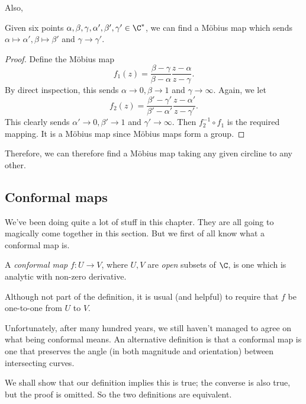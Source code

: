 \documentclass[a4paper]{article}
\begin{document}
Also,
\begin{prop}
  Given six points $\alpha, \beta, \gamma, \alpha', \beta', \gamma' \in \C^*$, we can find a M\"obius map which sends $\alpha \mapsto \alpha', \beta \mapsto \beta'$ and $\gamma \to \gamma'$.
\end{prop}

\begin{proof}
  Define the M\"obius map
  \[
    f_1(z) = \frac{\beta - \gamma}{\beta - \alpha} \frac{z - \alpha}{z - \gamma}.
  \]
  By direct inspection, this sends $\alpha \to 0, \beta \to 1$ and $\gamma \to \infty$. Again, we let
  \[
    f_2(z) = \frac{\beta' - \gamma'}{\beta' - \alpha'} \frac{z - \alpha'}{z - \gamma'}.
  \]
  This clearly sends $\alpha' \to 0, \beta' \to 1$ and $\gamma' \to \infty$. Then $f_2^{-1} \circ f_1$ is the required mapping. It is a M\"obius map since M\"obius maps form a group.
\end{proof}

Therefore, we can therefore find a M\"obius map taking any given circline to any other.

\subsection{Conformal maps}
We've been doing quite a lot of stuff in this chapter. They are all going to magically come together in this section. But we first of all know what a conformal map is.

\begin{defi}
  A \emph{conformal map} $f: U \to V$, where $U, V$ are \emph{open} subsets of $\C$, is one which is analytic with non-zero derivative.
\end{defi}
Although not part of the definition, it is usual (and helpful) to require that $f$ be one-to-one from $U$ to $V$.

Unfortunately, after many hundred years, we still haven't managed to agree on what being conformal means. An alternative definition is that a conformal map is one that preserves the angle (in both magnitude and orientation) between intersecting curves.

We shall show that our definition implies this is true; the converse is also true, but the proof is omitted. So the two definitions are equivalent.
\end{document}
